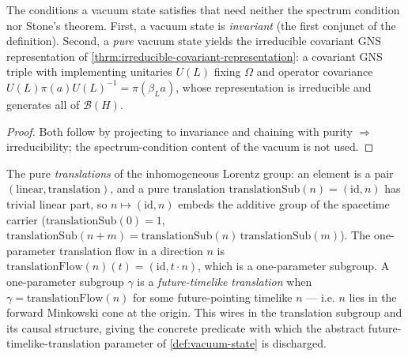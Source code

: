 \begin{theorem}
    \label{thrm:vacuum-no-stone}
    \leanok
    The conditions a vacuum state satisfies that need neither the spectrum condition nor Stone's theorem. First, a vacuum state is \emph{invariant} (the first conjunct of the definition). Second, a \emph{pure} vacuum state yields the irreducible covariant GNS representation of \ref{thrm:irreducible-covariant-representation}: a covariant GNS triple with implementing unitaries $U(L)$ fixing $\Omega$ and operator covariance $U(L)\pi(a)U(L)^{-1} = \pi(\beta_L a)$, whose representation is irreducible and generates all of $\mathcal{B}(H)$.
\end{theorem}
\begin{proof}
    \leanok
    Both follow by projecting to invariance and chaining with purity $\Rightarrow$ irreducibility; the spectrum-condition content of the vacuum is not used.
\end{proof}

\begin{definition}
    \label{def:future-timelike-translation}
    \leanok
    The pure \emph{translations} of the inhomogeneous Lorentz group: an element is a pair $(\text{linear}, \text{translation})$, and a pure translation $\mathrm{translationSub}(n) = (\mathrm{id}, n)$ has trivial linear part, so $n \mapsto (\mathrm{id}, n)$ embeds the additive group of the spacetime carrier ($\mathrm{translationSub}(0) = 1$, $\mathrm{translationSub}(n+m) = \mathrm{translationSub}(n)\,\mathrm{translationSub}(m)$). The one-parameter translation flow in a direction $n$ is $\mathrm{translationFlow}(n)(t) = (\mathrm{id}, t \cdot n)$, which is a one-parameter subgroup. A one-parameter subgroup $\gamma$ is a \emph{future-timelike translation} when $\gamma = \mathrm{translationFlow}(n)$ for some future-pointing timelike $n$ --- i.e. $n$ lies in the forward Minkowski cone at the origin. This wires in the translation subgroup and its causal structure, giving the concrete predicate with which the abstract future-timelike-translation parameter of \ref{def:vacuum-state} is discharged.
\end{definition}

